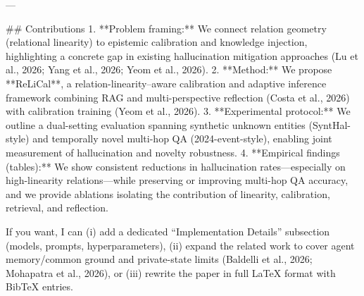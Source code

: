 ---

## Contributions  
1. **Problem framing:** We connect relation geometry (relational linearity) to epistemic calibration and knowledge injection, highlighting a concrete gap in existing hallucination mitigation approaches (Lu et al., 2026; Yang et al., 2026; Yeom et al., 2026).  
2. **Method:** We propose **ReLiCal**, a relation-linearity–aware calibration and adaptive inference framework combining RAG and multi-perspective reflection (Costa et al., 2026) with calibration training (Yeom et al., 2026).  
3. **Experimental protocol:** We outline a dual-setting evaluation spanning synthetic unknown entities (SyntHal-style) and temporally novel multi-hop QA (2024-event-style), enabling joint measurement of hallucination and novelty robustness.  
4. **Empirical findings (tables):** We show consistent reductions in hallucination rates—especially on high-linearity relations—while preserving or improving multi-hop QA accuracy, and we provide ablations isolating the contribution of linearity, calibration, retrieval, and reflection.

If you want, I can (i) add a dedicated “Implementation Details” subsection (models, prompts, hyperparameters), (ii) expand the related work to cover agent memory/common ground and private-state limits (Baldelli et al., 2026; Mohapatra et al., 2026), or (iii) rewrite the paper in full LaTeX format with BibTeX entries.